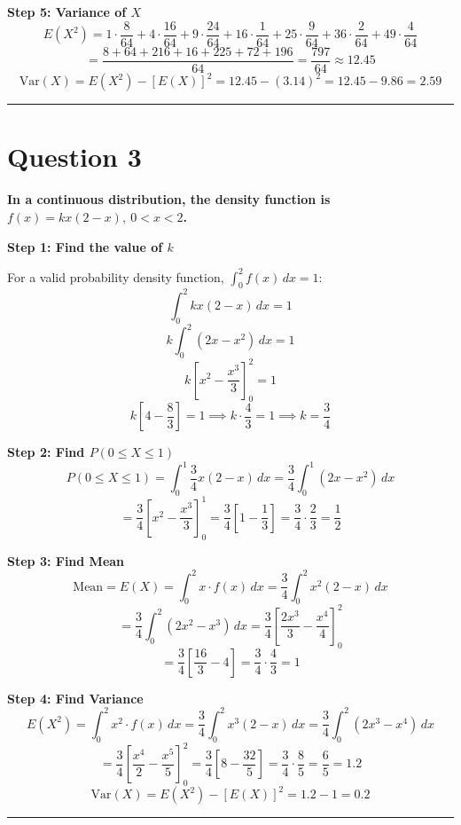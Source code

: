 \documentclass[12pt,a4paper]{article}
\begin{document}
\textbf{Step 5: Variance of $X$}
\[
E(X^2) = 1\!\cdot\!\frac{8}{64}+4\!\cdot\!\frac{16}{64}+9\!\cdot\!\frac{24}{64}+16\!\cdot\!\frac{1}{64}+25\!\cdot\!\frac{9}{64}+36\!\cdot\!\frac{2}{64}+49\!\cdot\!\frac{4}{64}
\]
\[
= \frac{8+64+216+16+225+72+196}{64} = \frac{797}{64} \approx 12.45
\]
\[
\text{Var}(X) = E(X^2) - [E(X)]^2 = 12.45 - (3.14)^2 = 12.45 - 9.86 = \boxed{2.59}
\]

\vspace{1em}\hrule\vspace{1em}

\section{Question 3}
\textbf{In a continuous distribution, the density function is $f(x) = kx(2-x),\ 0 < x < 2$.}

\textbf{Step 1: Find the value of $k$}

For a valid probability density function, $\displaystyle\int_{0}^{2} f(x)\,dx = 1$:
\[
\int_{0}^{2} kx(2-x)\,dx = 1
\]
\[
k\int_{0}^{2}(2x - x^2)\,dx = 1
\]
\[
k\left[x^2 - \frac{x^3}{3}\right]_0^2 = 1
\]
\[
k\left[4 - \frac{8}{3}\right] = 1 \implies k\cdot\frac{4}{3} = 1 \implies \boxed{k = \frac{3}{4}}
\]

\textbf{Step 2: Find $P(0 \leq X \leq 1)$}
\[
P(0 \leq X \leq 1) = \int_{0}^{1} \frac{3}{4}x(2-x)\,dx = \frac{3}{4}\int_{0}^{1}(2x - x^2)\,dx
\]
\[
= \frac{3}{4}\left[x^2 - \frac{x^3}{3}\right]_0^1 = \frac{3}{4}\left[1 - \frac{1}{3}\right] = \frac{3}{4}\cdot\frac{2}{3} = \boxed{\frac{1}{2}}
\]

\textbf{Step 3: Find Mean}
\[
\text{Mean} = E(X) = \int_{0}^{2} x\cdot f(x)\,dx = \frac{3}{4}\int_{0}^{2}x^2(2-x)\,dx
\]
\[
= \frac{3}{4}\int_{0}^{2}(2x^2 - x^3)\,dx = \frac{3}{4}\left[\frac{2x^3}{3} - \frac{x^4}{4}\right]_0^2
\]
\[
= \frac{3}{4}\left[\frac{16}{3} - 4\right] = \frac{3}{4}\cdot\frac{4}{3} = \boxed{1}
\]

\textbf{Step 4: Find Variance}
\[
E(X^2) = \int_{0}^{2} x^2\cdot f(x)\,dx = \frac{3}{4}\int_{0}^{2}x^3(2-x)\,dx = \frac{3}{4}\int_{0}^{2}(2x^3-x^4)\,dx
\]
\[
= \frac{3}{4}\left[\frac{x^4}{2} - \frac{x^5}{5}\right]_0^2 = \frac{3}{4}\left[8 - \frac{32}{5}\right] = \frac{3}{4}\cdot\frac{8}{5} = \frac{6}{5} = 1.2
\]
\[
\text{Var}(X) = E(X^2) - [E(X)]^2 = 1.2 - 1 = \boxed{0.2}
\]

\vspace{1em}\hrule\vspace{1em}
\end{document}
